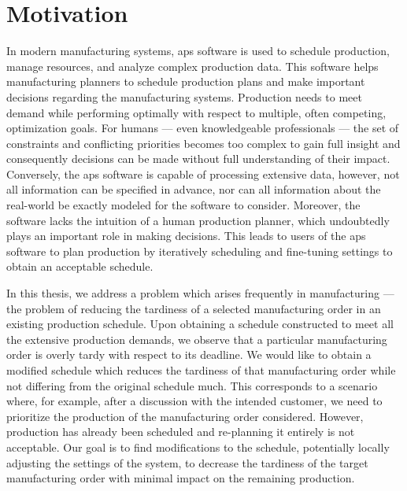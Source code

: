  \label{chap:introduction}

\section*{Motivation} \label{sec:introduction/motivation}

In modern manufacturing systems, \ac{aps} software is used to schedule production,
manage resources, and analyze complex production data.
This software helps manufacturing planners to schedule production plans
and make important decisions regarding the manufacturing systems.
Production needs to meet demand while performing optimally with respect to multiple,
often competing, optimization goals.
For humans --- even knowledgeable professionals ---
the set of constraints and conflicting priorities becomes too complex to gain full insight
and consequently decisions can be made without full understanding of their impact.
Conversely, the \ac{aps} software is capable of processing extensive data,
however, not all information can be specified in advance,
nor can all information about the real-world be exactly modeled for the software to consider.
Moreover, the software lacks the intuition of a human production planner,
which undoubtedly plays an important role in making decisions.
This leads to users of the \ac{aps} software to plan production by iteratively
scheduling and fine-tuning settings to obtain an acceptable schedule.

In this thesis, we address a problem which arises frequently in manufacturing ---
the problem of reducing the tardiness of a selected manufacturing order in an existing production schedule.
Upon obtaining a schedule constructed to meet all the extensive production demands,
we observe that a particular manufacturing order is overly tardy with respect to its deadline.
We would like to obtain a modified schedule which reduces the tardiness of that manufacturing order
while not differing from the original schedule much.
This corresponds to a scenario where, for example, after a discussion with the intended customer,
we need to prioritize the production of the manufacturing order considered.
However, production has already been scheduled and re-planning it entirely is not acceptable.
Our goal is to find modifications to the schedule,
potentially locally adjusting the settings of the system,
to decrease the tardiness of the target manufacturing order with minimal impact on the remaining production.

